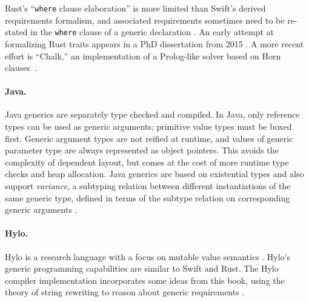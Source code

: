 \documentclass[../generics]{subfiles}
\begin{document}
Rust's ``\texttt{where} clause elaboration'' is more limited than Swift's derived requirements formalism, and associated requirements sometimes need to be re-stated in the \texttt{where} clause of a generic declaration \cite{rust_bug}. An early attempt at formalizing Rust traits appears in a PhD dissertation from 2015 \cite{Milewski_2015}. A more recent effort is ``Chalk,'' an implementation of a Prolog-like solver based on Horn clauses~\cite{rust_chalk}.

\paragraph{Java.}
Java generics are separately type checked and compiled. In Java, only reference types can be used as generic arguments; primitive value types must be boxed first. Generic argument types are not reified at runtime, and values of generic parameter type are always represented as object pointers. This avoids the complexity of dependent layout, but comes at the cost of more runtime type checks and heap allocation. Java generics are based on existential types and also support \emph{variance}, a subtyping relation between different instantiations of the same generic type, defined in terms of the subtype relation on corresponding generic arguments \cite{java_faq}.

\paragraph{Hylo.}
 Hylo is a research language with a focus on mutable value semantics \cite{hylo}. Hylo's generic programming capabilities are similar to Swift and Rust. The Hylo compiler implementation incorporates some ideas from this book, using the theory of string rewriting to reason about generic requirements \cite{hylorqm}.
\end{document}
